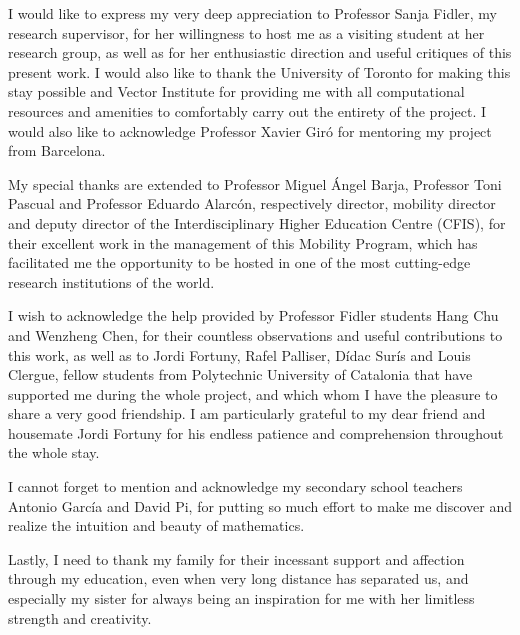 I would like to express my very deep appreciation to Professor Sanja Fidler, my
research supervisor, for her willingness to host me as a visiting student at her
research group, as well as for her enthusiastic direction and useful critiques
of this present work. I would also like to thank the University of Toronto for
making this stay possible and Vector Institute for providing me with all
computational resources and amenities to comfortably carry out the entirety of
the project. I would also like to acknowledge Professor Xavier Giró for
mentoring my project from Barcelona.

My special thanks are extended to Professor Miguel Ángel Barja, Professor Toni
Pascual and Professor Eduardo Alarcón, respectively director, mobility director
and deputy director of the Interdisciplinary Higher Education Centre (CFIS), for
their excellent work in the management of this Mobility Program, which has
facilitated me the opportunity to be hosted in one of the most cutting-edge
research institutions of the world.

I wish to acknowledge the help provided by Professor Fidler students Hang Chu
and Wenzheng Chen, for their countless observations and useful contributions to
this work, as well as to Jordi Fortuny, Rafel Palliser, Dídac Surís and Louis
Clergue, fellow students from Polytechnic University of Catalonia that have
supported me during the whole project, and which whom I have the pleasure to
share a very good friendship. I am particularly grateful to my dear friend and
housemate Jordi Fortuny for his endless patience and comprehension throughout
the whole stay.

I cannot forget to mention and acknowledge my secondary school teachers Antonio
García and David Pi, for putting so much effort to make me discover and realize
the intuition and beauty of mathematics.

Lastly, I need to thank my family for their incessant support and affection
through my education, even when very long distance has separated us, and
especially my sister for always being an inspiration for me with her limitless
strength and creativity.


\tableofcontents
\listoftables
\listoffigures
\printglossaries
